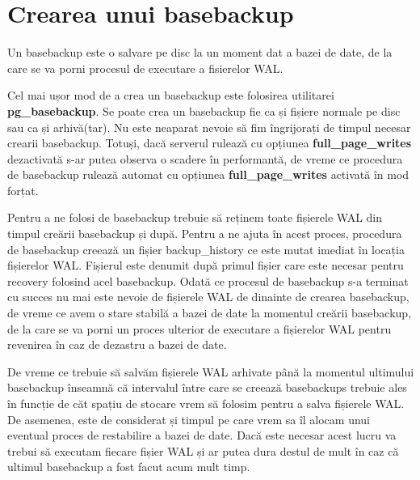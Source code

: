 \section{Crearea unui basebackup}
Un basebackup este o salvare pe disc la un moment dat a bazei de date, de la care se va porni procesul de executare a fisierelor WAL.
\par 
Cel mai ușor mod de a crea un basebackup este folosirea utilitarei \textbf{pg_basebackup}. Se poate crea un basebackup fie ca și fișiere normale pe disc sau ca și arhivă(tar). Nu este neaparat nevoie să fim îngrijorați de timpul necesar crearii basebackup. Totuși, dacă serverul rulează cu opțiunea \textbf{full_page_writes} dezactivată s-ar putea observa o scadere în performantă, de vreme ce procedura de basebackup rulează automat cu opțiunea \textbf{full_page_writes} activată în mod forțat.
\par
Pentru a ne folosi de basebackup trebuie să reținem toate fișierele WAL din timpul creării basebackup și după. Pentru a ne ajuta în acest proces, procedura de basebackup creează un fișier backup_history ce este mutat imediat în locația fișierelor WAL. Fișierul este denumit după primul fișier care este necesar pentru recovery folosind acel basebackup. Odată ce procesul de basebackup s-a terminat cu succes nu mai este nevoie de fișierele WAL de dinainte de crearea basebackup, de vreme ce avem o stare stabilă a bazei de date la momentul creării basebackup, de la care se va porni un proces ulterior de executare a fișierelor WAL pentru revenirea în caz de dezastru a bazei de date.
\par 
De vreme ce trebuie să salvăm fișierele WAL arhivate până la momentul ultimului basebackup înseamnă că intervalul între care se creează basebackups trebuie ales în funcție de căt spațiu de stocare vrem să folosim pentru a salva fișierele WAL. De asemenea, este de considerat și timpul pe care vrem sa îl alocam unui eventual proces de restabilire a bazei de date. Dacă este necesar acest lucru va trebui să executam fiecare fișier WAL și ar putea dura destul de mult în caz că ultimul basebackup a fost facut acum mult timp.
\vspace{6cm}
